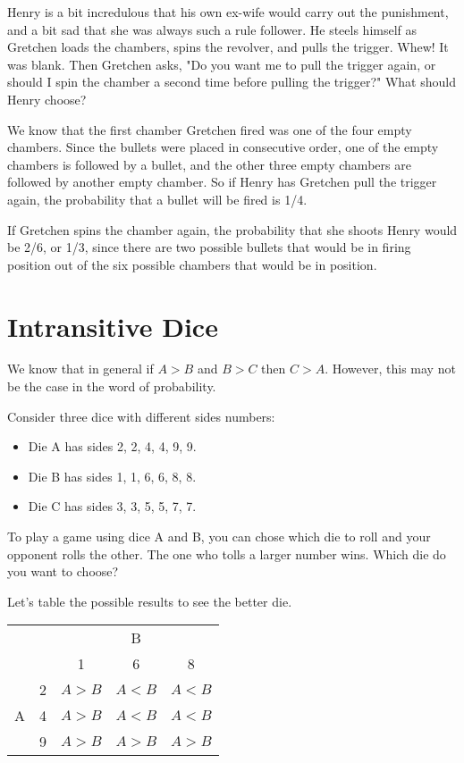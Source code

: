 Henry is a bit incredulous that his own ex-wife would carry out the punishment,
and a bit sad that she was always such a rule follower. He steels himself as
Gretchen loads the chambers, spins the revolver, and pulls the trigger. Whew! It
was blank. Then Gretchen asks, "Do you want me to pull the trigger again, or
should I spin the chamber a second time before pulling the trigger?" What should Henry choose?

We know that the first chamber Gretchen fired was one of the four empty
chambers. Since the bullets were placed in consecutive order, one of the empty
chambers is followed by a bullet, and the other three empty chambers are
followed by another empty chamber. So if Henry has Gretchen pull the trigger
again, the probability that a bullet will be fired is 1/4.

If Gretchen spins the chamber again, the probability that she shoots Henry would
be 2/6, or 1/3, since there are two possible bullets that would be in firing
position out of the six possible chambers that would be in position.

\hypertarget{Intransitive-Dice}{%
\section{Intransitive Dice}\label{Intransitive-Dice}}

We know that in general if $A>B$ and $B>C$ then $C>A$. However, this may not be the case in the word of probability.

Consider three dice with different sides numbers:
\begin{itemize}
\item Die A has sides 2, 2, 4, 4, 9, 9.
\item Die B has sides 1, 1, 6, 6, 8, 8.
\item Die C has sides 3, 3, 5, 5, 7, 7.
\end{itemize}

To play a game using dice A and B, you can chose which die to roll and your opponent rolls the other. The one who tolls a larger number wins. Which die do you want to choose?

Let's table the possible results to see the better die.
\begin{center}
  \begin{tabular}{cc|ccc}\hline
    &   & \multicolumn{3}{c}{B} \\
    &   & 1                & 6                & 8                \\ \hline
    \multirow{3}{*}{A}
    & 2 & \color{red}$A>B$ & $A<B$            & $A<B$            \\
    & 4 & \color{red}$A>B$ & $A<B$            & $A<B$            \\
    & 9 & \color{red}$A>B$ & \color{red}$A>B$ & \color{red}$A>B$ \\\hline
  \end{tabular}
\end{center}

